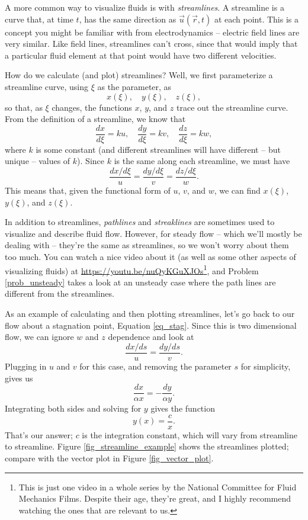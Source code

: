 A more common way to visualize fluids is with \emph{streamlines}.  A streamline is a curve that, at time \(t\), has the same direction as \(\vec{u}(\vec{r}, t)\) at each point. This is a concept you might be familiar with from electrodynamics -- electric field lines are very similar.  Like field lines, streamlines can't cross, since that would imply that a particular fluid element at that point would have two different velocities.  

How do we calculate (and plot) streamlines? Well, we first parameterize a streamline curve, using $\xi$ as the parameter, as 
\[
x(\xi), \quad y(\xi), \quad z(\xi),
\] 
so that, as $\xi$ changes, the functions $x$, $y$, and $z$ trace out the streamline curve.   From the definition of a streamline, we know that
\[
\frac{dx}{d\xi} = ku, \quad \frac{dy}{d\xi} = kv, \quad \frac{dz}{d\xi} = kw,
\] 
where $k$ is some constant (and different streamlines will have different -- but unique -- values of $k$). Since $k$ is the same along each streamline, we must have
\begin{equation}
\frac{dx/d\xi}{u} = \frac{dy/d\xi}{v} = \frac{dz/d\xi}{w}.
\end{equation} 
This means that, given the functional form of $u$, $v$, and $w$, we can find $x(\xi)$, $y(\xi)$, and $z(\xi)$.

In addition to streamlines, \emph{pathlines} and \emph{streaklines} are sometimes used to visualize and describe fluid flow.  However, for steady flow -- which we'll mostly be dealing with -- they're the same as streamlines, so we won't worry about them too much.  You can watch a nice video about it (as well as some other aspects of visualizing fluids) at \url{https://youtu.be/nuQyKGuXJOs}\footnote{This is just one video in a whole series by the National Committee for Fluid Mechanics Films.  Despite their age, they're great, and I highly recommend watching the ones that are relevant to us.}, and Problem \ref{prob_unsteady} takes a look at an unsteady case where the path lines are different from the streamlines.

\begin{example}
\label{ex_stag_stream}
As an example of calculating and then plotting streamlines, let's go back to our flow about a stagnation point, Equation \ref{eq_stag}.  Since this is two dimensional flow, we can ignore $w$ and $z$ dependence and look at 
\[
\frac{dx/ds}{u} = \frac{dy/ds}{v}.
\]
Plugging in \(u\) and \(v\) for this case, and removing the parameter $s$ for simplicity, gives us
\[
\frac{dx}{\alpha x} = -\frac{dy}{\alpha y}.
\] 
Integrating both sides and solving for \(y\) gives the function 
\begin{equation}
y(x) = \frac{c}{x}.
\label{eq_stream_ex}
\end{equation}
That's our answer; \(c\) is the integration constant, which will vary from streamline to streamline.  Figure \ref{fig_streamline_example} shows the streamlines plotted; compare with the vector plot in Figure \ref{fig_vector_plot}.
\end{example}

